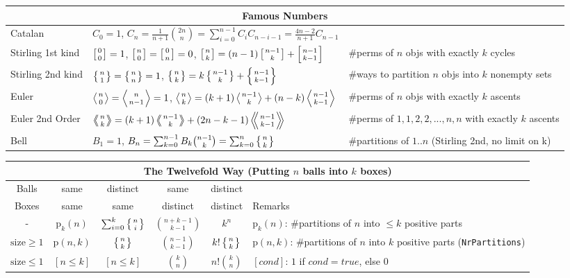 \begin{center}
\begin{tabular}{@{}l|l|l@{}}
\toprule
\multicolumn{3}{c}{Famous Numbers} \\ \midrule

Catalan	&	$C_0=1$, $C_n=\frac{1}{n+1}\binom{2n}{n} = \sum_{i=0}^{n-1}C_iC_{n-i-1} = \frac{4n-2}{n+1}C_{n-1}$  & \\
Stirling 1st kind & $\left[{0\atop 0}\right]=1$, $\left[{n\atop 0}\right]=\left[{0\atop n}\right]=0$, $\left[{n\atop k}\right]=(n-1)\left[{n-1\atop k}\right]+\left[{n-1\atop k-1}\right]$ & \#perms of $n$ objs with exactly $k$ cycles\\
Stirling 2nd kind & $\left\{{n\atop 1}\right\}=\left\{{n\atop n}\right\}=1$, $\left\{{n\atop k}\right\} = k \left\{{ n-1 \atop k }\right\} + \left\{{n-1\atop k-1}\right\}$ & \#ways to partition $n$ objs into $k$ nonempty sets\\
Euler	& $\left \langle {n\atop 0} \right \rangle = \left \langle {n\atop n-1} \right \rangle = 1 $, $\left \langle {n\atop k} \right \rangle = (k+1) \left \langle {n-1\atop {k}} \right \rangle + (n-k)\left \langle {{n-1}\atop {k-1}} \right \rangle$ & \#perms of $n$ objs with exactly $k$ ascents \\
Euler 2nd Order &  $\left \langle \!\!\left \langle {n\atop k} \right \rangle \!\! \right \rangle = (k+1) \left \langle \!\! \left \langle {{n-1}\atop {k}} \right \rangle \!\! \right \rangle +(2n-k-1)\left \langle \!\! \left \langle {{n-1}\atop {k-1}} \right \rangle  \!\! \right \rangle$ & \#perms of ${1,1,2,2,...,n,n}$ with exactly $k$ ascents \\
Bell & $B_1 = 1$, $B_n = \sum_{k=0}^{n-1} B_k \binom{n-1}{k} = \sum_{k=0}^n\left\{{n\atop k}\right\}$ & \#partitions of $1..n$ (Stirling 2nd, no limit on k)\\

\bottomrule
\end{tabular}
\end{center}

\begin{tabular}{@{}c|c|c|c|c|l@{}}
\toprule
\multicolumn{6}{c}{The Twelvefold Way (Putting $n$ balls into $k$ boxes)} \\ \hline
Balls & same & distinct & same & distinct & \\
Boxes & same & same & distinct & distinct & Remarks\\
\hline
- & $\mathrm{p}_k(n)$ & $\sum_{i=0}^k \left\{{n\atop i}\right\}$ & $\binom{n+k-1}{k-1}$ & $k^n$ & $\mathrm{p}_k(n)$: \#partitions of $n$ into $\le k$ positive parts \\
$\mathrm{size}\ge 1$ & $\mathrm{p}(n,k)$ & $\left\{{n\atop k}\right\}$ & $\binom{n-1}{k-1}$ & $k!\left\{{n\atop k}\right\}$ & $\mathrm{p}(n,k)$: \#partitions of $n$ into $k$ positive parts (\lstinline|NrPartitions|)\\
$\mathrm{size}\le 1$ & $[n \le k]$ & $[n \le k]$ & $\binom{k}{n}$ & $n!\binom{k}{n}$ & $[cond]$: $1$ if $cond=true$, else $0$\\


\bottomrule
\end{tabular}

